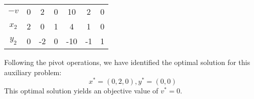 \begin{example}
\begin{table}[H]
\begin{tabular}{ccccccc}
        \multicolumn{1}{c|}{$-v$}  & \multicolumn{1}{c|}{0} & 2     & 0     & \multicolumn{1}{c|}{10}  & 2     & \multicolumn{1}{c|}{0} \\ \cline{2-7} 
        \multicolumn{1}{c|}{$x_2$} & \multicolumn{1}{c|}{2} & 0     & 1     & \multicolumn{1}{c|}{4}   & 1     & \multicolumn{1}{c|}{0} \\
        \multicolumn{1}{c|}{$y_2$} & \multicolumn{1}{c|}{0} & -2    & 0     & \multicolumn{1}{c|}{-10} & -1    & \multicolumn{1}{c|}{1} \\ \cline{2-7} 
        \end{tabular}
    \end{table}
    Following the pivot operations, we have identified the optimal solution for this auxiliary problem:
    \[x^{\ast}=(0,2,0), y^{\ast}=(0,0)\]
    This optimal solution yields an objective value of $v^{\ast}=0$. 


\end{example}
